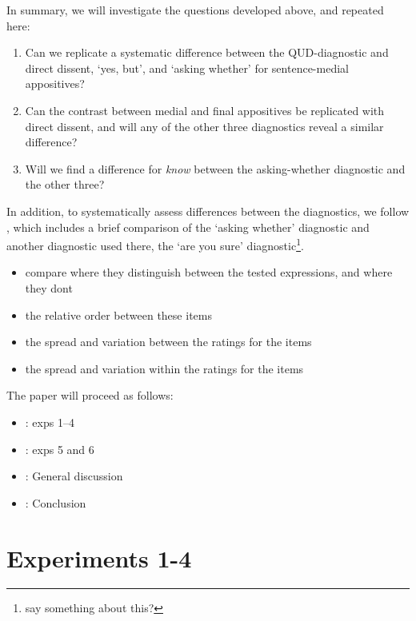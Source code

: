 \documentclass[times,linguex,xcolor]{glossa}
\begin{document}
  In summary, we will investigate the questions developed above, and repeated here:
    \begin{enumerate}
      \item Can we replicate a systematic difference between the QUD-diagnostic and direct dissent, ‘yes, but’, and `asking whether' for sentence-medial appositives?
      \item Can the contrast between medial and final appositives be replicated with direct dissent, and will any of the other three diagnostics reveal a similar difference?
      \item Will we find a difference for \emph{know} between the asking-whether diagnostic and the other three?
    \end{enumerate}

  In addition, to systematically assess differences between the diagnostics, we follow \citealt{tonhauser_how_2018}, which includes a brief comparison of the `asking whether' diagnostic and another diagnostic used there, the `are you sure' diagnostic\footnote{say something about this?}.

  \begin{itemize}
    \item compare where they distinguish between the tested expressions, and where they dont
    \item the relative order between these items
    \item the spread and variation between the ratings for the items
    \item the spread and variation within the ratings for the items
  \end{itemize}

  The paper will proceed as follows:
  \begin{itemize}
    \item {}: exps 1--4
    \item {}: exps 5 and 6
    \item {}: General discussion
    \item {}: Conclusion

  \end{itemize}


\section{Experiments 1-4 \label{sec:2_experiments}}
\end{document}
